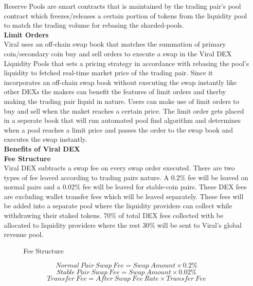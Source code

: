 \documentclass[10pt]{article}
\begin{document}
Reserve Pools are smart contracts that is maintained by the trading pair's pool contract which freezes/releases a certain portion of tokens from the liquidity pool to match the trading volume for rebasing the sharded-pools. \\



\textbf{Limit Orders}\\

Viral uses an off-chain swap book that matches the summation of primary coin/secondary coin buy and sell orders to execute a swap in the Viral DEX Liquidity Pools that sets a pricing strategy in accordance with rebasing the pool's liquidity to fetched real-time market price of the trading pair. Since it incorporates an off-chain swap book without executing the swap instantly like other DEXs the makers can benefit the features of limit orders and therby making the trading pair liquid in nature. Users can make use of limit orders to buy and sell when the maket reaches a certain price. The limit order gets placed in a seperate book that will run automated pool find algorithm and determines when a pool reaches a limit price and passes the order to the swap book and executes the swap instantly.\\


\textbf{Benefits of Viral DEX}\\




\textbf{Fee Structure}\\

Viral DEX subtracts a swap fee on every swap order executed. There are two types of fee leaved according to trading pairs nature. A 0.2\% fee will be leaved on normal pairs and a 0.02\% fee will be leaved for stable-coin pairs. These DEX fees are excluding wallet transfer fees which will be leaved separately. These fees will be added into a separate pool where the liquidity providers can collect while withdrawing their staked tokens. 70\% of total DEX fees collected with be allocated to liquidity providers where the rest 30\% will be sent to Viral's global revenue pool.\\

\begin{figure}[H]
\begin{center}
\caption{Fee Structure}
\end{center}
\end{figure}



\begin{equation}
Normal\:Pair\:Swap\:Fee=Swap\:Amount \times  0.2\%
\end{equation}
\begin{equation}
Stable\:Pair\:Swap\:Fee=Swap\:Amount \times  0.02\%
\end{equation}
\begin{equation}
Transfer\:Fee=After\:Swap\:Fee\:Rate \times  Transfer\:Fee
\end{equation}\\
\end{document}
